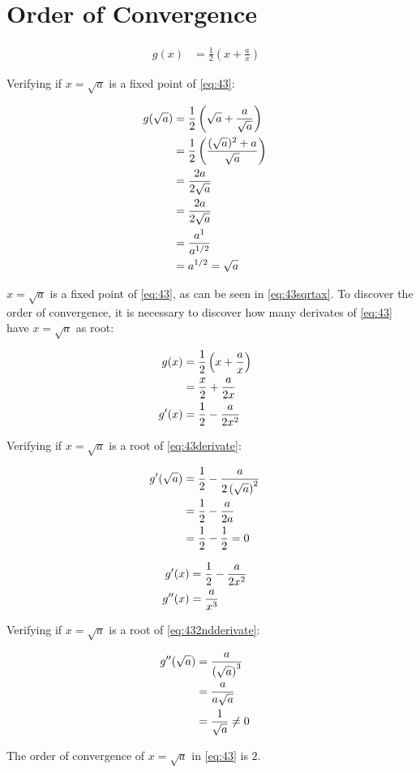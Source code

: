 \section{Order of Convergence}

	\begin{align}
		g(x) &= \frac{1}{2}\left(x+\frac{a}{x}\right)&
	\label{eq:43}
	\end{align}

	Verifying if $x=\sqrt{a}$ is a fixed point of \cref{eq:43}:

	\begin{align}
		g(\sqrt{a}) &= \frac{1}{2}\left(\sqrt{a}+\frac{a}{\sqrt{a}}\right)& \notag \\
		&= \frac{1}{2}\left(\frac{(\sqrt{a})^{2}+a}{\sqrt{a}}\right)& \notag \\
		&= \frac{2a}{2\sqrt{a}}& \notag \\
		&= \frac{2a}{2\sqrt{a}}& \notag \\
		&= \frac{a^{1}}{a^{1/2}}& \notag \\
		&= a^{1/2} = \sqrt{a}&
	\label{eq:43sqrtax}
	\end{align}

	$x=\sqrt{a}$ is a fixed point of \cref{eq:43}, as can be seen in \cref{eq:43sqrtax}. To discover the order of convergence, it is necessary to discover how many derivates of \cref{eq:43} have $x=\sqrt{a}$ as root:

	\begin{align}
		g(x) &= \frac{1}{2}\left(x+\frac{a}{x}\right)& \notag \\
		&= \frac{x}{2} + \frac{a}{2x}& \notag \\
		g'(x) &= \frac{1}{2} - \frac{a}{2x^{2}}&
	\label{eq:43derivate}
	\end{align}

	Verifying if $x=\sqrt{a}$ is a root of \cref{eq:43derivate}:

	\begin{align}
		g'(\sqrt{a}) &= \frac{1}{2} - \frac{a}{2\left(\sqrt{a}\right)^{2}}& \notag \\
		&= \frac{1}{2} - \frac{a}{2a}& \notag \\
		&= \frac{1}{2} - \frac{1}{2} = 0&
	\label{eq:33derivatesqrtax}
	\end{align}

	\begin{align}
		g'(x) &= \frac{1}{2} - \frac{a}{2x^{2}}& \notag \\
		g''(x) &= \frac{a}{x^{3}}&
	\label{eq:432ndderivate}
	\end{align}

	Verifying if $x=\sqrt{a}$ is a root of \cref{eq:432ndderivate}:

	\begin{align}
		g''(\sqrt{a}) &= \frac{a}{\left(\sqrt{a}\right)^{3}}& \notag \\
		&= \frac{a}{a\sqrt{a}}& \notag \\
		&= \frac{1}{\sqrt{a}} \neq 0&
	\label{eq:432ndderivatesqrtax}
	\end{align}

	The order of convergence of $x = \sqrt{a}$ in \cref{eq:43} is $2$.
